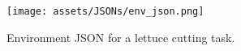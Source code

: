 \begin{figure}[t!]
    \centering
    \noindent
    \texttt{[image: assets/JSONs/env\_json.png]}
    \caption{Environment JSON for a lettuce cutting task.}
    \label{fig:environment_json_example}
\end{figure}